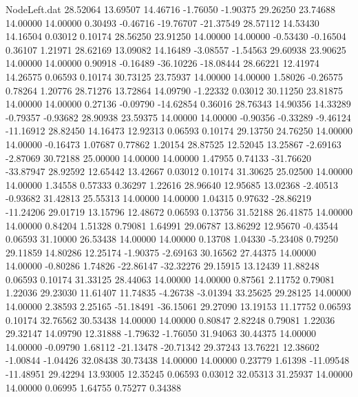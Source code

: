 \begin{filecontents}{NodeLeft.dat}
  28.52064   13.69507   14.46716    -1.76050   -1.90375   29.26250   23.74688   14.00000   14.00000    0.30493   -0.46716  -19.76707  -21.37549
  28.57112   14.53430   14.16504     0.03012    0.10174   28.56250   23.91250   14.00000   14.00000   -0.53430   -0.16504    0.36107    1.21971
  28.62169   13.09082   14.16489    -3.08557   -1.54563   29.60938   23.90625   14.00000   14.00000    0.90918   -0.16489  -36.10226  -18.08444
  28.66221   12.41974   14.26575     0.06593    0.10174   30.73125   23.75937   14.00000   14.00000    1.58026   -0.26575    0.78264    1.20776
  28.71276   13.72864   14.09790    -1.22332    0.03012   30.11250   23.81875   14.00000   14.00000    0.27136   -0.09790  -14.62854    0.36016
  28.76343   14.90356   14.33289    -0.79357   -0.93682   28.90938   23.59375   14.00000   14.00000   -0.90356   -0.33289   -9.46124  -11.16912
  28.82450   14.16473   12.92313     0.06593    0.10174   29.13750   24.76250   14.00000   14.00000   -0.16473    1.07687    0.77862    1.20154
  28.87525   12.52045   13.25867    -2.69163   -2.87069   30.72188   25.00000   14.00000   14.00000    1.47955    0.74133  -31.76620  -33.87947
  28.92592   12.65442   13.42667     0.03012    0.10174   31.30625   25.02500   14.00000   14.00000    1.34558    0.57333    0.36297    1.22616
  28.96640   12.95685   13.02368    -2.40513   -0.93682   31.42813   25.55313   14.00000   14.00000    1.04315    0.97632  -28.86219  -11.24206
  29.01719   13.15796   12.48672     0.06593    0.13756   31.52188   26.41875   14.00000   14.00000    0.84204    1.51328    0.79081    1.64991
  29.06787   13.86292   12.95670    -0.43544    0.06593   31.10000   26.53438   14.00000   14.00000    0.13708    1.04330   -5.23408    0.79250
  29.11859   14.80286   12.25174    -1.90375   -2.69163   30.16562   27.44375   14.00000   14.00000   -0.80286    1.74826  -22.86147  -32.32276
  29.15915   13.12439   11.88248     0.06593    0.10174   31.33125   28.44063   14.00000   14.00000    0.87561    2.11752    0.79081    1.22036
  29.23030   11.61407   11.74835    -4.26738   -3.01394   33.25625   29.28125   14.00000   14.00000    2.38593    2.25165  -51.18491  -36.15061
  29.27090   13.19153   11.17752     0.06593    0.10174   32.76562   30.53438   14.00000   14.00000    0.80847    2.82248    0.79081    1.22036
  29.32147   14.09790   12.31888    -1.79632   -1.76050   31.94063   30.44375   14.00000   14.00000   -0.09790    1.68112  -21.13478  -20.71342
  29.37243   13.76221   12.38602    -1.00844   -1.04426   32.08438   30.73438   14.00000   14.00000    0.23779    1.61398  -11.09548  -11.48951
  29.42294   13.93005   12.35245     0.06593    0.03012   32.05313   31.25937   14.00000   14.00000    0.06995    1.64755    0.75277    0.34388

\end{filecontents}
